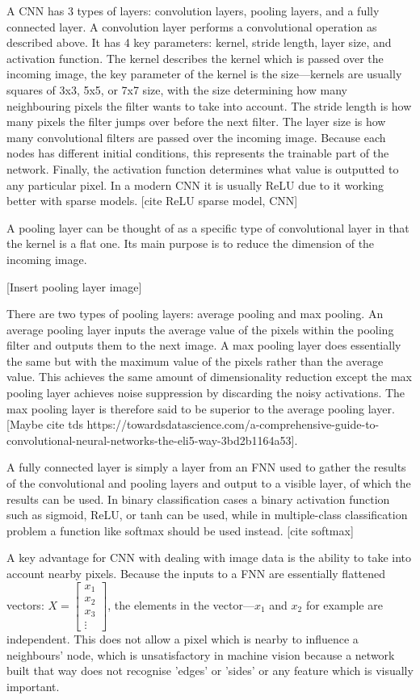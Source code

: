 \documentclass[a4paper,fleqn,usenatbib]{mnras}
\begin{document}
A CNN has 3 types of layers: convolution layers, pooling layers, and a fully connected layer. A convolution layer performs a convolutional operation as described above. It has 4 key parameters: kernel, stride length, layer size, and activation function. The kernel describes the kernel which is passed over the incoming image, the key parameter of the kernel is the size---kernels are usually squares of 3x3, 5x5, or 7x7 size, with the size determining how many neighbouring pixels the filter wants to take into account. The stride length is how many pixels the filter jumps over before the next filter. The layer size is how many convolutional filters are passed over the incoming image. Because each nodes has different initial conditions, this represents the trainable part of the network. Finally, the activation function determines what value is outputted to any particular pixel. In a modern CNN it is usually ReLU due to it working better with sparse models. [cite ReLU sparse model, CNN]

A pooling layer can be thought of as a specific type of convolutional layer in that the kernel is a flat one. Its main purpose is to reduce the dimension of the incoming image. 

[Insert pooling layer image]

There are two types of pooling layers: average pooling and max pooling. An average pooling layer inputs the average value of the pixels within the pooling filter and outputs them to the next image. A max pooling layer does essentially the same but with the maximum value of the pixels rather than the average value. This achieves the same amount of dimensionality reduction except the max pooling layer achieves noise suppression by discarding the noisy activations. The max pooling layer is therefore said to be superior to the average pooling layer. [Maybe cite tds https://towardsdatascience.com/a-comprehensive-guide-to-convolutional-neural-networks-the-eli5-way-3bd2b1164a53]. 

A fully connected layer is simply a layer from an FNN used to gather the results of the convolutional and pooling layers and output to a visible layer, of which the results can be used. In binary classification cases a binary activation function such as sigmoid, ReLU, or tanh can be used, while in multiple-class classification problem a function like softmax should be used instead. [cite softmax]

A key advantage for CNN with dealing with image data is the ability to take into account nearby pixels. Because the inputs to a FNN are essentially flattened vectors: $X=\begin{bmatrix}
           x_{1} \\
           x_{2} \\
           x_{3} \\
           \vdots
         \end{bmatrix}$, the elements in the vector---$x_1$ and $x_2$ for example are independent. This does not allow a pixel which is nearby to influence a neighbours' node, which is unsatisfactory in machine vision because a network built that way does not recognise 'edges' or 'sides' or any feature which is visually important.
\end{document}
